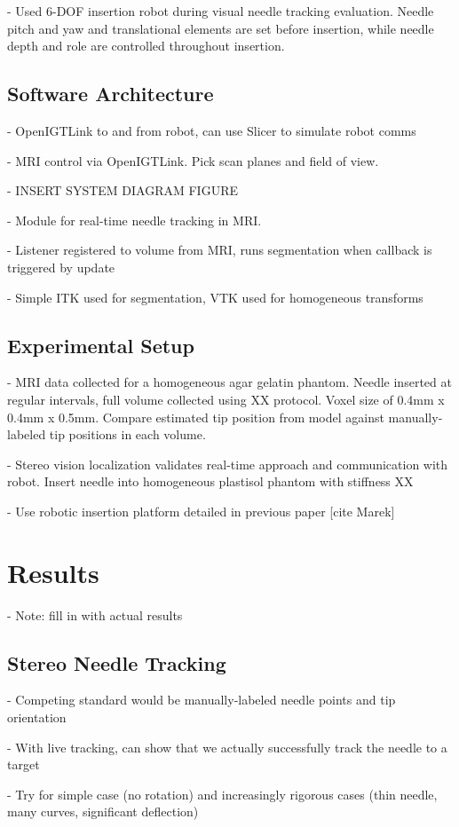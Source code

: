 - Used 6-DOF insertion robot during visual needle tracking evaluation. Needle pitch and yaw and translational elements are set before insertion, while needle depth and role are controlled throughout insertion.

\subsection{Software Architecture}
- OpenIGTLink to and from robot, can use Slicer to simulate robot comms

- MRI control via OpenIGTLink. Pick scan planes and field of view.

- INSERT SYSTEM DIAGRAM FIGURE

- Module for real-time needle tracking in MRI.

- Listener registered to volume from MRI, runs segmentation when callback is triggered by update

- Simple ITK used for segmentation, VTK used for homogeneous transforms

\subsection{Experimental Setup}
- MRI data collected for a homogeneous agar gelatin phantom. Needle inserted at regular intervals, full volume collected using XX protocol. Voxel size of 0.4mm x 0.4mm x 0.5mm. Compare estimated tip position from model against manually-labeled tip positions in each volume.

- Stereo vision localization validates real-time approach and communication with robot. Insert needle into homogeneous plastisol phantom with stiffness XX

- Use robotic insertion platform detailed in previous paper [cite Marek]

\section{Results}
- Note: fill in with actual results

\subsection{Stereo Needle Tracking}
- Competing standard would be manually-labeled needle points and tip orientation

- With live tracking, can show that we actually successfully track the needle to a target

- Try for simple case (no rotation) and increasingly rigorous cases (thin needle, many curves, significant deflection)

